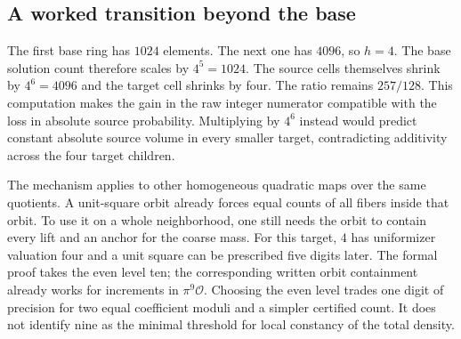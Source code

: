 \documentclass[12pt,letterpaper]{article}
\begin{document}
\subsection{A worked transition beyond the base}
The first base ring has $1024$ elements. The next one has $4096$, so $h=4$. The base solution count therefore scales by $4^5=1024$. The source cells themselves shrink by $4^6=4096$ and the target cell shrinks by four. The ratio remains $257/128$. This computation makes the gain in the raw integer numerator compatible with the loss in absolute source probability. Multiplying by $4^6$ instead would predict constant absolute source volume in every smaller target, contradicting additivity across the four target children.
\par
The mechanism applies to other homogeneous quadratic maps over the same quotients. A unit-square orbit already forces equal counts of all fibers inside that orbit. To use it on a whole neighborhood, one still needs the orbit to contain every lift and an anchor for the coarse mass. For this target, $4$ has uniformizer valuation four and a unit square can be prescribed five digits later. The formal proof takes the even level ten; the corresponding written orbit containment already works for increments in $\pi^9\mathcal O$. Choosing the even level trades one digit of precision for two equal coefficient moduli and a simpler certified count. It does not identify nine as the minimal threshold for local constancy of the total density.
\end{document}
